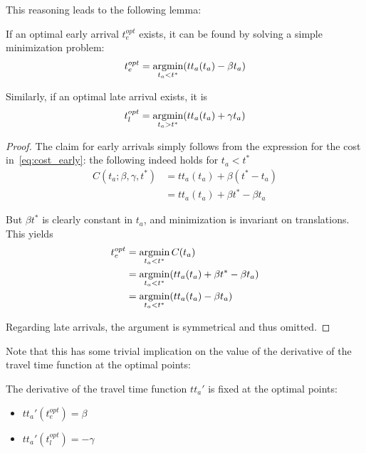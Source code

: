 This reasoning leads to the following lemma:
\begin{lemma}
  \label{lemma:cost_decoupled}
  If an optimal early arrival \(t_e^{opt}\) exists,
  it can be found by solving a simple minimization problem:
  \begin{equation*}
    t_e^{opt} = \operatorname*{argmin}_{t_a < t^*} (tt_a(t_a) - \beta t_a)
  \end{equation*}

  Similarly, if an optimal late arrival exists,
  it is
  \begin{equation*}
    t_l^{opt} = \operatorname*{argmin}_{t_a > t^*} (tt_a(t_a) + \gamma t_a)
  \end{equation*}
\end{lemma}
\begin{proof}
  The claim for early arrivals simply follows from the expression for the cost in~\eqref{eq:cost_early}:
  the following indeed holds for \(t_a < t^*\)
  \begin{align*}
    C(t_a; \beta, \gamma, t^*) & = tt_a(t_a) + \beta(t^*- t_a) \\
                               & = tt_a(t_a) + \beta t^* - \beta t_a
  \end{align*}

  But \(\beta t^*\) is clearly constant in \(t_a\),
  and minimization is invariant on translations.
  This yields
  \begin{align*}
    t_e^{opt} & = \operatorname*{argmin}_{t_a < t^*} C(t_a) \\
              & = \operatorname*{argmin}_{t_a < t^*} (tt_a(t_a) + \beta t^* - \beta t_a) \\
              & = \operatorname*{argmin}_{t_a < t^*} (tt_a(t_a) - \beta t_a)
  \end{align*}

  Regarding late arrivals, the argument is symmetrical and thus omitted.
\end{proof}

Note that this has some trivial implication on the value of the derivative of the travel time function at the optimal points:
\begin{obs}
  \label{obs:foc}
  The derivative of the travel time function \(tt_a'\) is fixed at the optimal points:
  \begin{itemize}
  \item \(tt_a'(t_e^{opt}) = \beta\)
  \item \(tt_a'(t_l^{opt}) = -\gamma\)
  \end{itemize}
\end{obs}

